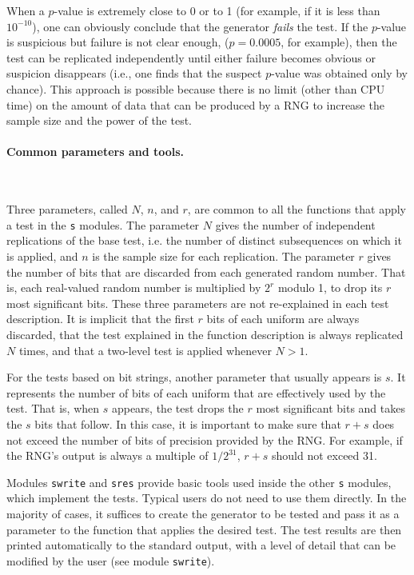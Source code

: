 When a $p$-value is extremely close to 0 or to 1 (for example,
if it is less than $10^{-10}$), one can obviously conclude that
the generator {\em fails\/} the test.
If the $p$-value is suspicious but failure is not clear enough,
($p=0.0005$, for example), then the test can be replicated independently
until either failure becomes obvious or suspicion disappears
(i.e., one finds that the suspect $p$-value was obtained only by chance).
This approach is possible because there is no limit (other than CPU time)
on the amount of data that can be produced by a RNG to increase the
sample size and the power of the test.

\paragraph*{Common parameters and tools.} \

Three parameters, called $N$, $n$, and $r$, are common to all the
functions that apply a test in the {\tt s} modules.
The parameter $N$ gives the number of independent replications of the
base test, i.e. the number of distinct subsequences on which it is applied,
and $n$ is the sample size for each replication.
The parameter $r$ gives the number of bits that are discarded
from each generated random number.
That is, each real-valued random number is multiplied by $2^r$ modulo 1,
to drop its $r$ most significant bits.
These three parameters are not re-explained in each test description.
It is implicit that the first $r$ bits of each uniform are always
discarded, that the test explained in the function description
is always replicated $N$ times, and that a two-level test is applied
whenever $N > 1$.

For the tests based on bit strings, another parameter that usually
appears is $s$.  It represents the number
of bits of each uniform that are effectively used by the test.
That is, when $s$ appears, the test drops the $r$ most significant bits
and takes the $s$ bits that follow.
In this case, it is important to make sure that $r+s$ does not exceed
the number of bits of precision provided by the RNG.
For example, if the RNG's output is always a multiple of $1/2^{31}$,
$r+s$ should not exceed 31.

\ifdetailed  %
Modules {\tt swrite} and  {\tt sres}
provide basic tools used inside the other
{\tt s} modules, which implement the tests.
Typical users do not need to use them directly.
In the majority of cases, it suffices to create the generator
to be tested and pass it as a parameter to
the function that applies the desired test.
The test results are then printed automatically
to the standard output, with a level of detail that can be modified
by the user (see module {\tt swrite}).
\fi  %

